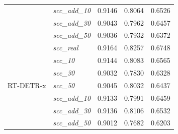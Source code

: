 \begin{table}[h!]
{\begin{tabular}{l|l|c|c|c}
                                      & \textit{scc\_add\_10}   & 0.9146                     & 0.8064                     & 0.6526                     \\
                                      & \textit{scc\_add\_30}   & 0.9043                     & 0.7962                     & 0.6457                     \\
                                      & \textit{scc\_add\_50}   & 0.9036                     & 0.7932                     & 0.6372                     \\
        \midrule
        \multirow[t]{7}{*}{RT-DETR-x} & \textit{scc\_real}      & \cellcolor{blue!10}0.9164  & \cellcolor{blue!10}0.8257  & \cellcolor{blue!10}0.6748  \\
                                      & \textit{scc\_10}        & 0.9144                     & 0.8083                     & 0.6565                     \\
                                      & \textit{scc\_30}        & 0.9032                     & 0.7830                     & 0.6328                     \\
                                      & \textit{scc\_50}        & 0.9045                     & 0.8032                     & 0.6437                     \\
                                      & \textit{scc\_add\_10}   & 0.9133                     & 0.7991                     & 0.6459                     \\
                                      & \textit{scc\_add\_30}   & 0.9136                     & 0.8106                     & 0.6532                     \\
                                      & \textit{scc\_add\_50}   & 0.9012                     & 0.7682                     & 0.6203                     \\
        \bottomrule
    \end{tabular}%
    }
\end{table}



